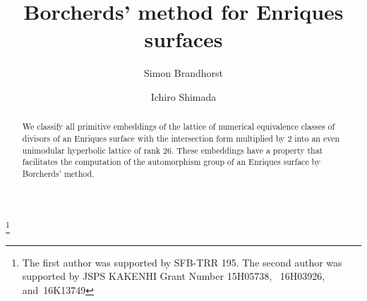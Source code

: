 \documentclass{amsart}
\numberwithin{equation}{section}
\numberwithin{table}{section}
\numberwithin{figure}{section}
\begin{document}
\title[Borcherds' method for Enriques surfaces]
{Borcherds' method for Enriques surfaces}
%
\author{Simon Brandhorst}
\address{(S. B.) Saarland University, Fachbereich Mathematik, Postfach 151150, Saarbr\"ucken, Germany}
%
\author{Ichiro Shimada}
\address{(I. S.) Department of Mathematics,
Graduate School of Science,
Hiroshima University,
1-3-1 Kagamiyama,
Higashi-Hiroshima,
739-8526 JAPAN}


\thanks{The first author was supported by SFB-TRR 195.
The second author was supported by JSPS KAKENHI Grant Number 15H05738, ~16H03926,  and~16K13749}




\begin{abstract}
We classify all primitive embeddings
of  the lattice of numerical equivalence classes of divisors
of an Enriques surface with the intersection form multiplied by $2$
into an even unimodular hyperbolic lattice of rank $26$.
These embeddings have a property
that facilitates  the computation
of the automorphism group of an Enriques surface
by Borcherds' method.
\end{abstract}

\maketitle
\end{document}
